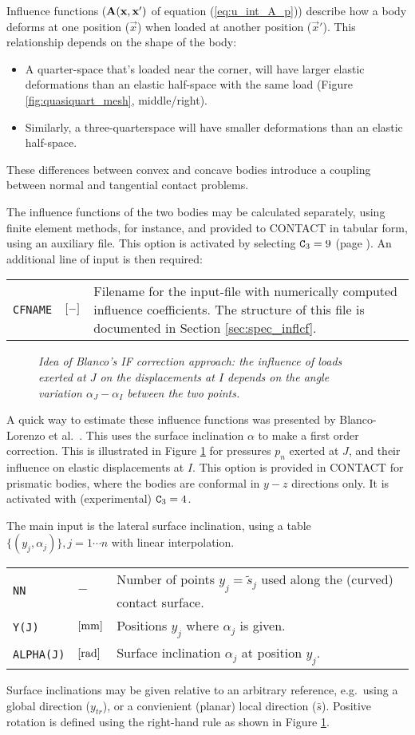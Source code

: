 \documentclass[12pt]{report}
\newenvironment{inputvars}{\vspace{0.4\baselineskip}%

\begin{tabular}{>{\raggedright}p{22mm}p{19mm}p{113mm}}}{
\end{tabular}

}
\newcommand{\inpvar}[3]{{\small\tt #1} & $#2$ & #3 \\[1ex]}
\begin{document}
Influence functions ($\mathbf{A}(\mathbf{x},\mathbf{x}')$ of equation
(\ref{eq:u_int_A_p})) describe how a body deforms at one position
($\vec{x}$) when loaded at another position ($\vec{x}'$). This relationship
depends on the shape of the body:
\begin{itemize}
\item A quarter-space that's loaded near the corner, will have larger
        elastic deformations than an elastic half-space with the same load
        (Figure \ref{fig:quasiquart_mesh}, middle/right).
\item Similarly, a three-quarterspace will have smaller deformations than
        an elastic half-space.
\end{itemize}
These differences between convex and concave bodies introduce a coupling
between normal and tangential contact problems.

The influence functions of the two bodies may be calculated separately,
using finite element methods, for instance, and provided to CONTACT in
tabular form, using an auxiliary file. This option is activated by
selecting ${\tt C}_3=9$ (page \pageref{c3-digit}). An additional line of
input is then required:
\begin{inputvars}
\inpvar{CFNAME}{\bunit{-}}{Filename for the input-file with numerically computed
        influence coefficients. The structure of this file is documented
        in Section \ref{sec:spec_inflcf}.}
\end{inputvars}

\begin{figure}[bt]
\centering
{}
\caption{\em Idea of Blanco's IF correction approach: the influence of
        loads exerted at $J$ on the displacements at $I$ depends on the
        angle variation $\alpha_J-\alpha_I$ between the two points.}
\label{fig:blanco-if}
\end{figure}

A quick way to estimate these influence functions was presented by
Blanco-Lorenzo et al.\ \cite{BlancoLorenzo2016,BlancoLorenzo2021a-inflcoef}.
This uses the surface inclination $\alpha$ to make a first order correction.
This is illustrated in Figure \ref{fig:blanco-if} for pressures $p_n$ exerted
at $J$, and their influence on elastic displacements at $I$.  This option is
provided in CONTACT for prismatic bodies, where the bodies are conformal in
$y-z$ directions only. It is activated with (experimental) ${\tt C}_3=4$.

The main input is the lateral surface inclination, using a table
$\{ (y_j, \alpha_j) \}, j=1\cdots n$ with linear interpolation.
\begin{inputvars}
\inpvar{NN}{-}{Number of points $y_j=\tilde{s}_j$ used along the (curved)
        contact surface.}
\inpvar{Y(J)}{\bunit{mm}}{Positions $y_j$ where $\alpha_j$ is given.}
\inpvar{ALPHA(J)}{\bunit{rad}}{Surface inclination $\alpha_j$ at position $y_j$.}
\end{inputvars}
Surface inclinations may be given relative to an arbitrary reference, e.g.\
using a global direction ($y_{tr}$), or a convienient (planar) local
direction ($\bar{s}$). Positive rotation is defined using the right-hand
rule as shown in Figure \ref{fig:blanco-if}.
\end{document}
